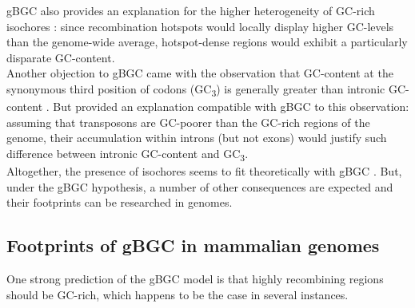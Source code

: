 gBGC also provides an explanation for the higher heterogeneity of GC-rich isochores \citep{clay2001compositional,clay2001compositionala}: since recombination hotspots would locally display higher GC-levels than the genome-wide average, hotspot-dense regions would exhibit a particularly disparate GC-content.\\

Another objection to gBGC \citep{eyre-walker1999evidence} came with the observation that GC-content at the synonymous third position of codons (GC\textsubscript{3}) is generally greater than intronic GC-content \citep{clay1996human}.
But \citet{duret2001elevated} provided an explanation compatible with gBGC to this observation: assuming that transposons are GC-poorer than the GC-rich regions of the genome, their accumulation within introns (but not exons) would justify such difference between intronic GC-content and GC\textsubscript{3}.\\

Altogether, the presence of isochores seems to fit theoretically with gBGC \citep{duret2006new}.
But, under the gBGC hypothesis, a number of other consequences are expected and their footprints can be researched in genomes.



\subsection{Footprints of gBGC in mammalian genomes}

One strong prediction of the gBGC model is that highly recombining regions should be GC-rich, which happens to be the case in several instances.

